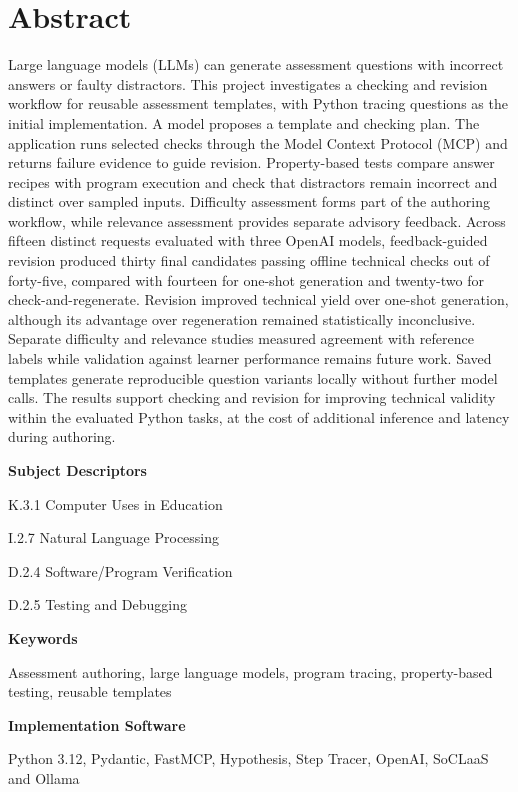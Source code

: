 \section*{Abstract}

Large language models (LLMs) can generate assessment questions with incorrect answers or faulty distractors. This project investigates a checking and revision workflow for reusable assessment templates, with Python tracing questions as the initial implementation. A model proposes a template and checking plan. The application runs selected checks through the Model Context Protocol (MCP) and returns failure evidence to guide revision. Property-based tests compare answer recipes with program execution and check that distractors remain incorrect and distinct over sampled inputs. Difficulty assessment forms part of the authoring workflow, while relevance assessment provides separate advisory feedback. Across fifteen distinct requests evaluated with three OpenAI models, feedback-guided revision produced thirty final candidates passing offline technical checks out of forty-five, compared with fourteen for one-shot generation and twenty-two for check-and-regenerate. Revision improved technical yield over one-shot generation, although its advantage over regeneration remained statistically inconclusive. Separate difficulty and relevance studies measured agreement with reference labels while validation against learner performance remains future work. Saved templates generate reproducible question variants locally without further model calls. The results support checking and revision for improving technical validity within the evaluated Python tasks, at the cost of additional inference and latency during authoring.

\medskip\noindent\textbf{Subject Descriptors}\par\smallskip
K.3.1 Computer Uses in Education\par
I.2.7 Natural Language Processing\par
D.2.4 Software/Program Verification\par
D.2.5 Testing and Debugging\par

\medskip\noindent\textbf{Keywords}\par\smallskip
Assessment authoring, large language models, program tracing, property-based testing, reusable templates

\medskip\noindent\textbf{Implementation Software}\par\smallskip
Python 3.12, Pydantic, FastMCP, Hypothesis, Step Tracer, OpenAI, SoCLaaS and Ollama
